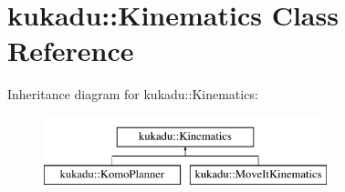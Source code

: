 \hypertarget{classkukadu_1_1Kinematics}{\section{kukadu\-:\-:Kinematics Class Reference}
\label{classkukadu_1_1Kinematics}
}
Inheritance diagram for kukadu\-:\-:Kinematics\-:\begin{figure}[H]
\begin{center}
\leavevmode
\includegraphics[height=2.000000cm]{classkukadu_1_1Kinematics}
\end{center}
\end{figure}
